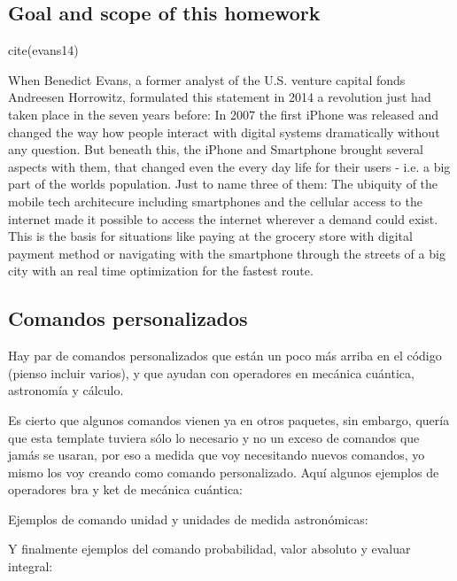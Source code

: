 \documentclass[11pt,letterpaper]{article}
\begin{document}
\subsection*{Goal and scope of this homework}
\begin{center}
 cite(evans14)
 \end{center}
 
When Benedict Evans, a former analyst of the U.S. venture capital fonds Andreesen Horrowitz, formulated this statement in 2014 a revolution just had taken place in the seven years before: In 2007 the first iPhone was released and changed the way how people interact with digital systems dramatically without any question. But beneath this, the iPhone and Smartphone brought several aspects with them, that changed even the every day life for their users - i.e. a big part of the worlds population. Just to name three of them: The ubiquity of the mobile tech architecure including smartphones and the cellular access to the internet made it possible to access the internet wherever a demand could exist. This is the basis for situations like paying at the grocery store with digital payment method or navigating with the smartphone through the streets of a big city with an real time optimization for the fastest route.

\subsection*{Comandos personalizados}

Hay par de comandos personalizados que están un poco más arriba en el código (pienso incluir varios), y que ayudan con operadores en mecánica cuántica, astronomía y cálculo.\par

Es cierto que algunos comandos vienen ya en otros paquetes, sin embargo, quería que esta template tuviera sólo lo necesario y no un exceso de comandos que jamás se usaran, por eso a medida que voy necesitando nuevos comandos, yo mismo los voy creando como comando personalizado. Aquí algunos ejemplos de operadores bra y ket de mecánica cuántica:

Ejemplos de comando unidad y unidades de medida astronómicas:


Y finalmente ejemplos del comando probabilidad, valor absoluto y evaluar integral:




\newpage

\end{document}
